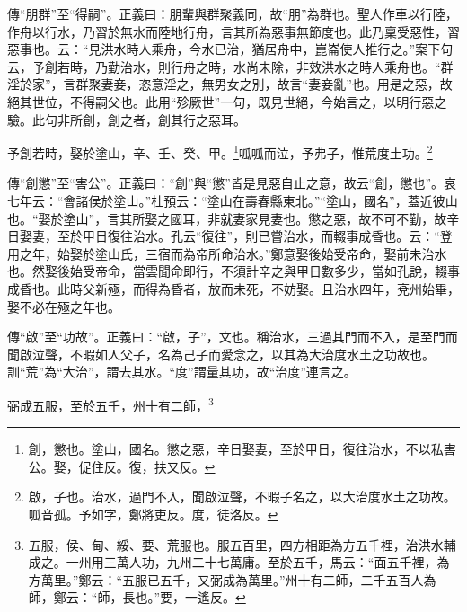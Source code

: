 {\noindent\zhuan{}\fzbyks 傳“朋群”至“得嗣”。正義曰：朋輩與群聚義同，故“朋”為群也。聖人作車以行陸，作舟以行水，乃習於無水而陸地行舟，言其所為惡事無節度也。此乃稟受惡性，習惡事也。云：“見洪水時人乘舟，今水已治，猶居舟中，崑崙使人推行之。”案下句云，予創若時，乃勤治水，則行舟之時，水尚未除，非效洪水之時人乘舟也。“群淫於家”，言群聚妻妾，恣意淫之，無男女之別，故言“妻妾亂”也。用是之惡，故絕其世位，不得嗣父也。此用“殄厥世”一句，既見世絕，今始言之，以明行惡之驗。此句非所創，創之者，創其行之惡耳。 \par}

予創若時，娶於塗山，辛、壬、癸、甲。\footnote{創，懲也。塗山，國名。懲之惡，辛日娶妻，至於甲日，復往治水，不以私害公。娶，促住反。復，扶又反。}呱呱而泣，予弗子，惟荒度土功。\footnote{啟，子也。治水，過門不入，聞啟泣聲，不暇子名之，以大治度水土之功故。呱音孤。予如字，鄭將吏反。度，徒洛反。}


{\noindent\zhuan{}\fzbyks 傳“創懲”至“害公”。正義曰：“創”與“懲”皆是見惡自止之意，故云“創，懲也”。哀七年云：“會諸侯於塗山。”杜預云：“塗山在壽春縣東北。”“塗山，國名”，蓋近彼山也。“娶於塗山”，言其所娶之國耳，非就妻家見妻也。懲之惡，故不可不勤，故辛日娶妻，至於甲日復往治水。孔云“復往”，則已嘗治水，而輟事成昏也。云：“登用之年，始娶於塗山氏，三宿而為帝所命治水。”鄭意娶後始受帝命，娶前未治水也。然娶後始受帝命，當雲聞命即行，不須計辛之與甲日數多少，當如孔說，輟事成昏也。此時父新殛，而得為昏者，放而未死，不妨娶。且治水四年，兗州始畢，娶不必在殛之年也。 \par}

{\noindent\zhuan{}\fzbyks 傳“啟”至“功故”。正義曰：“啟，子”，文也。稱治水，三過其門而不入，是至門而聞啟泣聲，不暇如人父子，名為己子而愛念之，以其為大治度水土之功故也。訓“荒”為“大治”，謂去其水。“度”謂量其功，故“治度”連言之。 \par}

弼成五服，至於五千，州十有二師，\footnote{五服，侯、甸、綏、要、荒服也。服五百里，四方相距為方五千裡，治洪水輔成之。一州用三萬人功，九州二十七萬庸。至於五千，馬云：“面五千裡，為方萬里。”鄭云：“五服已五千，又弼成為萬里。”州十有二師，二千五百人為師，鄭云：“師，長也。”要，一遙反。}


